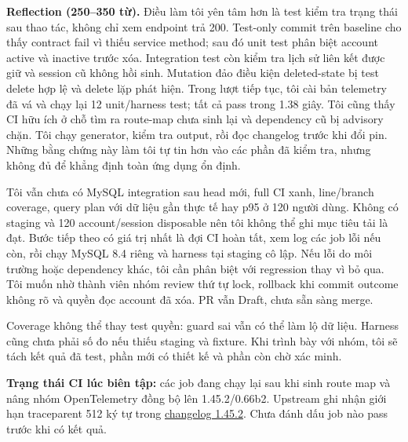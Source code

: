 \documentclass[10pt,a4paper]{article}
\begin{document}
\textbf{Reflection (250--350 từ).} Điều làm tôi yên tâm hơn là test kiểm tra trạng thái sau thao tác, không chỉ xem endpoint trả 200. Test-only commit trên baseline cho thấy contract fail vì thiếu service method; sau đó unit test phân biệt account active và inactive trước xóa. Integration test còn kiểm tra lịch sử liên kết được giữ và session cũ không hồi sinh. Mutation đảo điều kiện deleted-state bị test delete hợp lệ và delete lặp phát hiện. Trong lượt tiếp tục, tôi cài bản telemetry đã vá và chạy lại 12 unit/harness test; tất cả pass trong 1.38 giây. Tôi cũng thấy CI hữu ích ở chỗ tìm ra route-map chưa sinh lại và dependency cũ bị advisory chặn. Tôi chạy generator, kiểm tra output, rồi đọc changelog trước khi đổi pin. Những bằng chứng này làm tôi tự tin hơn vào các phần đã kiểm tra, nhưng không đủ để khẳng định toàn ứng dụng ổn định.

Tôi vẫn chưa có MySQL integration sau head mới, full CI xanh, line/branch coverage, query plan với dữ liệu gần thực tế hay p95 ở 120 người dùng. Không có staging và 120 account/session disposable nên tôi không thể ghi mục tiêu tải là đạt. Bước tiếp theo có giá trị nhất là đợi CI hoàn tất, xem log các job lỗi nếu còn, rồi chạy MySQL 8.4 riêng và harness tại staging cô lập. Nếu lỗi do môi trường hoặc dependency khác, tôi cần phân biệt với regression thay vì bỏ qua. Tôi muốn nhờ thành viên nhóm review thứ tự lock, rollback khi commit outcome không rõ và quyền đọc account đã xóa. PR vẫn Draft, chưa sẵn sàng merge.

Coverage không thể thay test quyền: guard sai vẫn có thể làm lộ dữ liệu. Harness cũng chưa phải số đo nếu thiếu staging và fixture. Khi trình bày với nhóm, tôi sẽ tách kết quả đã test, phần mới có thiết kế và phần còn chờ xác minh.

\textbf{Trạng thái CI lúc biên tập:} các job đang chạy lại sau khi sinh route map và nâng nhóm OpenTelemetry đồng bộ lên 1.45.2/0.66b2. Upstream ghi nhận giới hạn traceparent 512 ký tự trong \href{https://github.com/open-telemetry/opentelemetry-python/blob/main/CHANGELOG.md}{changelog 1.45.2}. Chưa đánh dấu job nào pass trước khi có kết quả.
\end{document}
